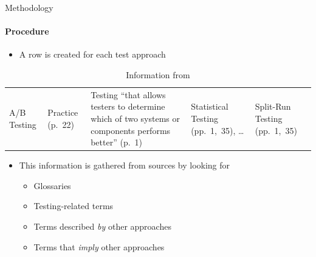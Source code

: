 \documentclass{beamer}
\begin{document}
\begin{frame}{Methodology}
    \framesubtitle{Procedure}
    \begin{itemize}
        \item A row is created for each test approach
    \end{itemize}
    \begin{center}
        \begin{table}
            \small
            \begin{tabularx}{\linewidth}{|M{1.1cm}|M{1.3cm}|X|M{1.5cm}|M{1.6cm}|}
                \hline
                 &  &                                                                                     &                        &            \\
                \hline
                A/B Testing           & Practice {\tiny (p.~22)}  & Testing ``that allows testers to determine which of two systems or components performs better'' {\tiny (p.~1)} & Statistical Testing {\tiny (pp.~1,~35)}, \dots{} & Split-Run Testing {\tiny (pp.~1,~35)} \\
                \hline
            \end{tabularx}
            \caption{\tiny Information from \citep{IEEE2022}}
        \end{table}
    \end{center}
    \pause \vspace{-0.5cm}
    \begin{itemize}
        \item This information is gathered from sources by looking for
              \begin{itemize}
                  \item Glossaries
                  \item Testing-related terms
                  \item Terms described \emph{by} other approaches
                  \item Terms that \emph{imply} other approaches
              \end{itemize}
    \end{itemize}
\end{frame}
\end{document}
